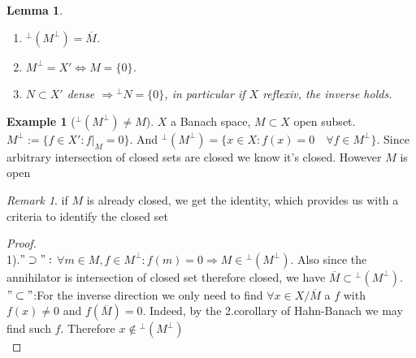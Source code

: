 \documentclass[a4paper,11pt,fleqn]{book}
\newtheorem{lemma}[theorem]{Lemma}
\theoremstyle{definition}
\newtheorem*{example}{Example}
\theoremstyle{remark}
\newtheorem*{remark}{Remark}
\begin{document}
\begin{lemma}\quad
	\begin{enumerate}
		\item ${}^\perp(M^\perp) = \overline{M}$.
		\item $M^\perp = X' \Leftrightarrow M = \{0\}$.
		\item $N \subset X'$ dense $\Rightarrow {}^\perp N = \{0\}$, in particular if $X$ reflexiv, the inverse holds.
	\end{enumerate}
\end{lemma}
\begin{example}[${}^\perp(M^\perp) \neq M$]
	$X$ a Banach space, $M\subset X$ open subset. $M^\perp := \{f \in X': f|_M  = 0 \}$. And ${}^\perp (M^\perp) = \{x \in X: f(x) = 0 \quad \forall f \in M^\perp \}$. Since arbitrary intersection of closed sets are closed we know it's closed. However $M$ is open 
\end{example}
\begin{remark}
if $M$ is already closed, we get the identity, which provides us with a criteria to identify the closed set	
\end{remark}

\begin{proof}
	\quad\\
	1).$"\supset":$ $\forall m \in M, f \in M^\perp: f(m) = 0 \Rightarrow M \in {}^\perp (M^\perp)$. Also since the annihilator is intersection of closed set therefore closed, we have $\overline{M} \subset {}^\perp (M^\perp)$.\\
	$"\subset"$:For the inverse direction we only need to find $\forall x  \in X\slash \overline{M}$ a $f$ with $f(x) \neq 0$ and $f(\overline{M}) = 0$. Indeed, by the 2.corollary of Hahn-Banach we may find such $f$. Therefore $x \notin {}^\perp (M^\perp)$\\
\end{proof}


	
\end{document}
